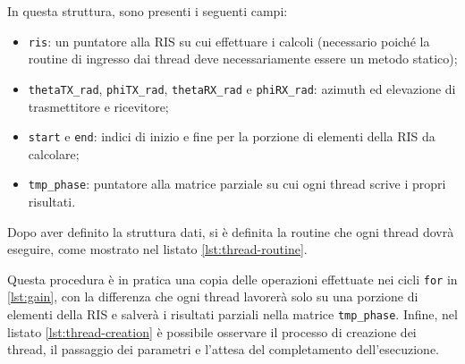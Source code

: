 \vspace{1em}

\vspace{1em}

In questa struttura, sono presenti i seguenti campi:

\begin{itemize}
  \item \texttt{ris}: un puntatore alla RIS su cui effettuare i calcoli (necessario
    poiché la routine di ingresso dai thread deve necessariamente essere un
    metodo statico);

  \item \texttt{thetaTX\_rad}, \texttt{phiTX\_rad}, \texttt{thetaRX\_rad} e
    \texttt{phiRX\_rad}: azimuth ed elevazione di trasmettitore e ricevitore;

  \item \texttt{start} e \texttt{end}: indici di inizio e fine per la porzione
    di elementi della RIS da calcolare;

  \item \texttt{tmp\_phase}: puntatore alla matrice parziale su cui ogni thread scrive
    i propri risultati.
\end{itemize}

Dopo aver definito la struttura dati, si è definita la routine che ogni thread
dovrà eseguire, come mostrato nel listato \ref{lst:thread-routine}.

\vspace{1em}

\vspace{1em}

Questa procedura è in pratica una copia delle operazioni effettuate nei cicli
\texttt{for} in \ref{lst:gain}, con la differenza che ogni thread lavorerà solo
su una porzione di elementi della RIS e salverà i risultati parziali nella
matrice \texttt{tmp\_phase}. Infine, nel listato \ref{lst:thread-creation} è possibile
osservare il processo di creazione dei thread, il passaggio dei parametri e l'attesa
del completamento dell'esecuzione.

\vspace{1em}


